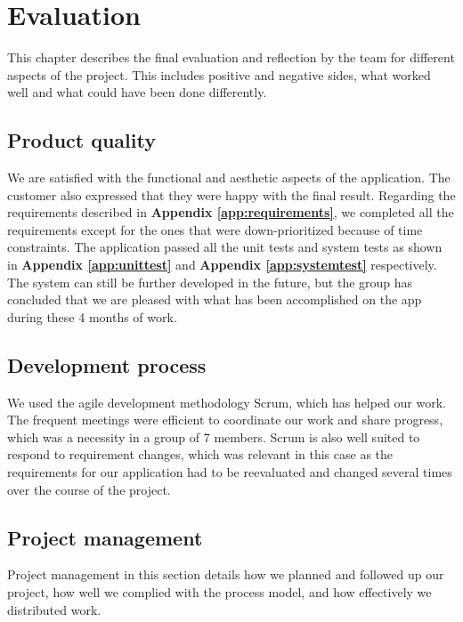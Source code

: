 
\chapter{Evaluation}

This chapter describes the final evaluation and reflection by the team for different aspects of the project. This includes positive and negative sides, what worked well and what could have been done differently.

\section{Product quality}

We are satisfied with the functional and aesthetic aspects of the application. The customer also expressed that they were happy with the final result. Regarding the requirements described in \textbf{Appendix \ref{app:requirements}}, we completed all the requirements except for the ones that were down-prioritized because of time constraints.
The application passed all the unit tests and system tests as shown in \textbf{Appendix \ref{app:unittest}} and \textbf{Appendix \ref{app:systemtest}} respectively. The system can still be further developed in the future, but the group has concluded that we are pleased with what has been accomplished on the app during these 4 months of work.

\section{Development process}

We used the agile development methodology Scrum, which has helped our work. The frequent meetings were efficient to coordinate our work and share progress, which was a necessity in a group of 7 members. Scrum is also well suited to respond to requirement changes, which was relevant in this case as the requirements for our application had to be reevaluated and changed several times over the course of the project.

\section{Project management}

Project management in this section details how we planned and followed up our project, how well we complied with the process model, and how effectively we distributed work.\newline

